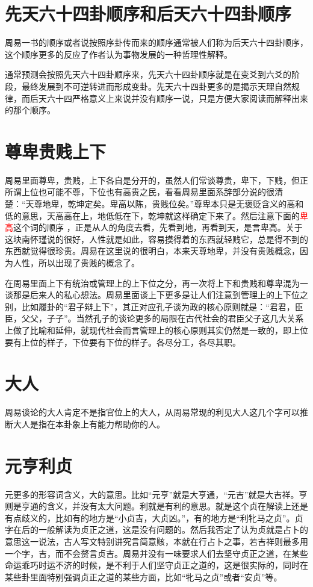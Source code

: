 \documentclass[12pt,oneside]{book}
\renewcommand{\emph}[1]{\textcolor{red}{#1}}
\begin{document}
\section{先天六十四卦顺序和后天六十四卦顺序}
周易一书的顺序或者说按照序卦传而来的顺序通常被人们称为后天六十四卦顺序，这个顺序更多的反应了作者认为事物发展的一种哲理性解释。

通常预测会按照先天六十四卦顺序来，先天六十四卦顺序就是在变爻到六爻的阶段，最终发展到不可逆转进而形成变卦。先天六十四卦更多的是揭示天理自然规律，而后天六十四严格意义上来说并没有顺序一说，只是方便大家阅读而解释出来的那个顺序。

\section{尊卑贵贱上下}
周易里面尊卑，贵贱，上下各自是分开的，虽然人们常谈尊贵，卑下，下贱，但正所谓上位也可能不尊，下位也有高贵之民，看看周易里面系辞部分说的很清楚：“天尊地卑，乾坤定矣。卑高以陈，贵贱位矣。”尊卑本只是无褒贬含义的高和低的意思，天高高在上，地低低在下，乾坤就这样确定下来了。然后注意下面的\emph{卑高}这个词的顺序 ，正是从人的角度去看，先看到地，再看到天，是言卑高。关于这块南怀瑾说的很好，人性就是如此，容易摸得着的东西就轻贱它，总是得不到的东西就觉得很珍贵。周易在这里说的很明白，本来天尊地卑，并没有贵贱概念，因为人性，所以出现了贵贱的概念了。

在周易里面上下有统治或管理上的上下位之分，再一次将上下和贵贱和尊卑混为一谈那是后来人的私心想法。周易里面谈上下更多是让人们注意到管理上的上下位之别，比如履卦的“君子辩上下”，其正对应孔子谈为政的核心原则就是：“君君，臣臣，父父，子子”。当然孔子的谈论更多的局限在古代社会的君臣父子这几大关系上做了比喻和延伸，就现代社会而言管理上的核心原则其实仍然是一致的，即上位要有上位的样子，下位要有下位的样子。各尽分工，各尽其职。

\section{大人}
周易谈论的大人肯定不是指官位上的大人，从周易常现的利见大人这几个字可以推断大人是指在本卦象上有能力帮助你的人。

\section{元亨利贞}
元更多的形容词含义，大的意思。比如“元亨”就是大亨通，“元吉”就是大吉祥。亨则是亨通的含义，并没有太大问题。利就是有利的意思。就是这个贞在解读上还是有点歧义的，比如有的地方是“小贞吉，大贞凶。”，有的地方是“利牝马之贞”。贞字在后的一般解读为贞正之道，这是没有问题的。然后我否定了认为贞就是占卜的意思这一说法，古人写文特别讲究言简意赅，本就在行占卜之事，若吉祥则最多用一个字，吉，而不会赘言贞吉。周易并没有一味要求人们去坚守贞正之道，在某些命运乖巧时运不济的时候，是不利于人们坚守贞正之道的，这是很实际的，同时在某些卦里面特别强调贞正之道的某些方面，比如“牝马之贞”或者“安贞”等。
\end{document}
